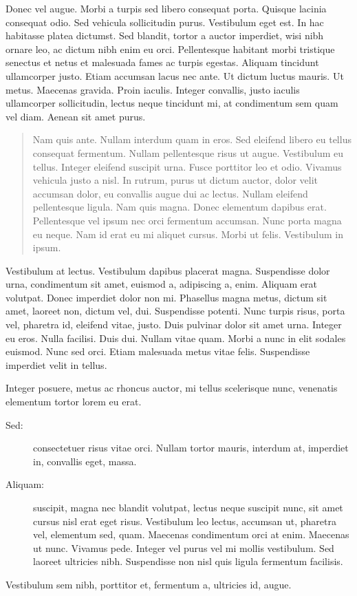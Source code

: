 \documentclass[cfonts]{nostarch}
\begin{document}
Donec vel augue. Morbi a turpis sed libero consequat porta. Quisque
lacinia consequat odio. Sed vehicula sollicitudin purus. Vestibulum
eget est. In hac habitasse platea dictumst. Sed blandit, tortor a
auctor imperdiet, wisi nibh ornare leo, ac dictum nibh enim eu orci.
Pellentesque habitant morbi tristique senectus et netus et malesuada
fames ac turpis egestas.  Aliquam tincidunt ullamcorper justo. Etiam
accumsan lacus nec ante.  Ut dictum luctus mauris. Ut metus. Maecenas
gravida. Proin iaculis.  Integer convallis, justo iaculis ullamcorper
sollicitudin, lectus neque tincidunt mi, at condimentum sem quam vel
diam. Aenean sit amet purus.
\begin{quote}
  Nam quis ante. Nullam interdum quam in eros.  Sed eleifend libero eu
  tellus consequat fermentum. Nullam pellentesque risus ut augue.
  Vestibulum eu tellus. Integer eleifend suscipit urna. Fusce
  porttitor leo et odio. Vivamus vehicula justo a nisl. In rutrum,
  purus ut dictum auctor, dolor velit accumsan dolor, eu convallis
  augue dui ac lectus. Nullam eleifend pellentesque ligula. Nam quis
  magna. Donec elementum dapibus erat. Pellentesque vel ipsum nec orci
  fermentum accumsan. Nunc porta magna eu neque.  Nam id erat eu mi
  aliquet cursus. Morbi ut felis. Vestibulum in ipsum.
\end{quote}

Vestibulum at lectus. Vestibulum dapibus placerat magna. Suspendisse
dolor urna, condimentum sit amet, euismod a, adipiscing a, enim.
Aliquam erat volutpat. Donec imperdiet dolor non mi. Phasellus magna
metus, dictum sit amet, laoreet non, dictum vel, dui. Suspendisse
potenti. Nunc turpis risus, porta vel, pharetra id, eleifend vitae,
justo. Duis pulvinar dolor sit amet urna. Integer eu eros. Nulla
facilisi. Duis dui.  Nullam vitae quam. Morbi a nunc in elit sodales
euismod. Nunc sed orci. Etiam malesuada metus vitae felis. Suspendisse
imperdiet velit in tellus.
\begin{quotation}
\lipsum[40-41]  
\end{quotation}

Integer posuere, metus ac rhoncus auctor, mi tellus scelerisque nunc,
venenatis elementum tortor lorem eu erat.  
\begin{description}
\item[Sed:] consectetuer risus
vitae orci. Nullam tortor mauris, interdum at, imperdiet in, convallis
eget, massa. 
\item[Aliquam:] suscipit, magna nec blandit volutpat, lectus
neque suscipit nunc, sit amet cursus nisl erat eget risus. Vestibulum
leo lectus, accumsan ut, pharetra vel, elementum sed, quam. Maecenas
condimentum orci at enim. Maecenas ut nunc. Vivamus pede. Integer vel
purus vel mi mollis vestibulum. Sed laoreet ultricies nibh.
Suspendisse non nisl quis ligula fermentum facilisis. 
\end{description}
Vestibulum sem nibh, porttitor et, fermentum a, ultricies id, augue.
\end{document}

